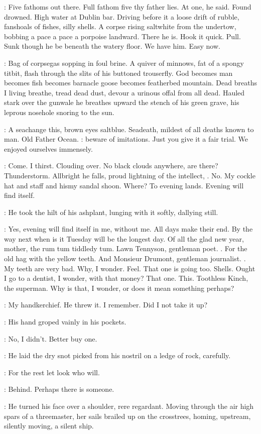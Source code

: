 \StephenInt:
Five fathoms out there.
Full fathom five thy father lies.
At one, he said.
Found drowned.
High water at Dublin bar.
Driving before it a loose drift of rubble,
fanshoals of fishes, silly shells.
A corpse rising saltwhite from the undertow,
bobbing a pace a pace a porpoise landward.
There he is.
Hook it quick.
Pull.
Sunk though he be beneath the watery floor.
We have him.
Easy now.

\StephenInt:
Bag of corpsegas sopping in foul brine.
A quiver of minnows,
fat of a spongy titbit,
flash through the slits of his buttoned trouserfly.
God becomes man
becomes fish
becomes barnacle goose
becomes featherbed mountain.
Dead breaths I living breathe,
tread dead dust,
devour a urinous offal from all dead.
Hauled stark over the gunwale
he breathes upward the stench of his green grave,
his leprous nosehole snoring to the sun.

\StephenInt:
A seachange this, brown eyes saltblue.
Seadeath, mildest of all deaths known to man.
Old Father Ocean.
:
beware of imitations.
Just you give it a fair trial.
We enjoyed ourselves immensely.

\StephenInt:
Come.
I thirst.
Clouding over.
No black clouds anywhere, are there?
Thunderstorm.
Allbright he falls, proud lightning of the intellect,
.
No.
My cockle hat and staff and hismy sandal shoon.
Where?
To evening lands.
Evening will find itself.

:
He took the hilt of his ashplant,
lunging with it softly, dallying still.

\StephenInt:
Yes, evening will find itself in me,
without me.
All days make their end.
By the way next when is it Tuesday
will be the longest day.
Of all the glad new year,
mother, the rum tum tiddledy tum.
Lawn Tennyson, gentleman poet.
.
For the old hag with the yellow teeth.
And Monsieur Drumont,
gentleman journalist.
.
My teeth are very bad.
Why, I wonder.
Feel.
That one is going too.
Shells.
Ought I go to a dentist, I wonder, with that money?
That one.
This.
Toothless Kinch, the superman.
Why is that, I wonder,
or does it mean something perhaps?

\StephenInt:
My handkerchief.
He threw it.
I remember.
Did I not take it up?

:
His hand groped vainly in his pockets.

\StephenInt:
No, I didn't.
Better buy one.

:
He laid the dry snot picked from his nostril
on a ledge of rock,
carefully.

\StephenInt:
For the rest let look who will.

\StephenInt:
Behind.
Perhaps there is someone.

:
He turned his face over a shoulder, rere regardant.
Moving through the air high spars of a threemaster,
her sails brailed up on the crosstrees,
homing, upstream, silently moving,
a silent ship.
